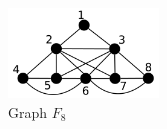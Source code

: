 \begin{figure}[htb]	
 \center%
 \includegraphics[width=4cm]{./img/f8.png}
 \caption{Graph $F_{8}$}
\label{fig:f8}
\end{figure}  
 